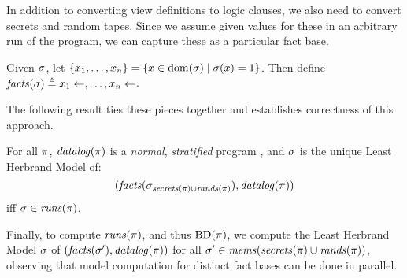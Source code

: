 In addition to converting view definitions to logic clauses, we also need to convert
secrets and random tapes. Since we assume given values for these in an arbitrary run of
the program, we can capture these as a particular fact base.
\begin{definition}
  Given $\sigma$, let $\{x_1,\ldots,x_n \} =
  \{ x \in \mathrm{dom}(\sigma) \mid \sigma(x) = 1 \}$.
  Then define $\mathit{facts}(\sigma) \triangleq x_1 \gets, \ldots, x_n \gets$.
\end{definition}
The following result ties these pieces together and establishes
correctness of this approach.
\begin{lemma}
  For all $\pi$, 
  $\mathit{datalog}(\pi)$ is a \emph{normal}, \emph{stratified}
  program \cite{aspis2018linear}, and $\sigma$ is the unique Least Herbrand
  Model of: $$(\mathit{facts}(\sigma_{\mathit{secrets}(\pi) \cup \mathit{rands}(\pi)}),\mathit{datalog}(\pi))$$
  iff $\sigma \in \mathit{runs}(\pi)$.
\end{lemma}
Finally, to compute $\mathit{runs}(\pi)$, and thus $\mathrm{BD}(\pi)$, we compute
the Least Herbrand Model $\sigma$ of $(\mathit{facts}(\sigma'),\mathit{datalog}(\pi))$
for all $\sigma' \in \mathit{mems}(\mathit{secrets}(\pi) \cup \mathit{rands}(\pi))$, observing
that model computation for distinct fact bases can be done in parallel. 
